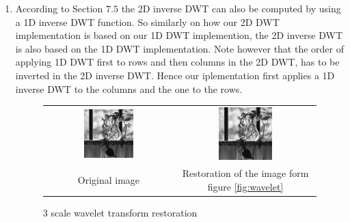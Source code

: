 \documentclass[a4paper]{article}
\begin{document}
\begin{enumerate}
\item
According to Section $7.5$ the 2D inverse DWT can also be computed by using a 1D inverse DWT function.
So similarly on how our 2D DWT implementation is based on our 1D DWT implemention, the 2D inverse DWT is also based on the 1D DWT implementation.
Note however that the order of applying 1D DWT first to rows and then columns in the 2D DWT, has to be inverted in the 2D inverse DWT.
Hence our iplementation first applies a 1D inverse DWT to the columns and the one to the rows.

\begin{figure}[H]
\centering
\begin{tabular}{cc}
 \includegraphics[width=0.4\textwidth]{../lab3ex2/vase.png} & \includegraphics[width=0.4\textwidth]{../lab3ex2/output.png} \\
 Original image & Restoration of the image form figure \ref{fig:wavelet} \\
\end{tabular}
\caption{3 scale wavelet transform restoration}
\label{fig:waveletback}
\end{figure}

\end{enumerate}
\end{document}
